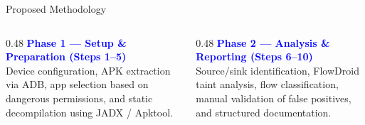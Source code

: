 \documentclass[aspectratio=169]{beamer}
\begin{document}
\begin{frame}{Proposed Methodology}
\vspace{2pt}
\begin{columns}[T]
    \begin{column}{0.48\textwidth}
        \textbf{\textcolor{blue}{Phase 1 — Setup \& Preparation (Steps 1–5)}}\\
        \footnotesize
        Device configuration, APK extraction via ADB, app selection based on
        dangerous permissions, and static decompilation using JADX / Apktool.
    \end{column}
    \begin{column}{0.48\textwidth}
        \textbf{\textcolor{blue}{Phase 2 — Analysis \& Reporting (Steps 6–10)}}\\
        \footnotesize
        Source/sink identification, FlowDroid taint analysis, flow classification,
        manual validation of false positives, and structured documentation.
    \end{column}
\end{columns}
\end{frame}
\end{document}
